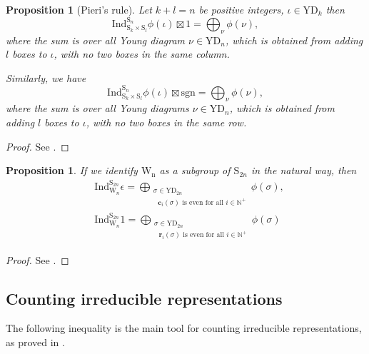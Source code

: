 \documentclass[12pt, a4paper]{amsart}
\numberwithin{equation}{section}
\newtheorem{prop}[thm]{Proposition}
\newcommand{\br}{{\mathbf{r}}}
\newcommand{\bc}{{\mathbf{c}}}
\newcommand{\BN}{{\mathbb {N}}}
\newcommand{\Ind}{{\mathrm{Ind}}}
\newcommand{\sgn}{{\mathrm{sgn}}}
\begin{document}
\begin{prop}[Pieri's rule]\label{Pieri}
    Let $k + l = n$ be positive integers, $\iota \in \mathrm{YD}_{k}$ then
    \begin{equation}
        \Ind_{\mathrm{S}_k \times \mathrm{S}_l}^{\mathrm{S}_{n}}\phi(\iota) \boxtimes 1 = \bigoplus_{\nu} \phi(\nu),
    \end{equation}
    where the sum is over all Young diagram $\nu \in \mathrm{YD}_n$, which is obtained from adding $l$ boxes to $\iota$, with no two boxes in the same column.
    
    Similarly, we have
    \begin{equation}
        \Ind_{\mathrm{S}_{k} \times \mathrm{S}_{l}}^{\mathrm{S}_n}\phi(\iota) \boxtimes \sgn = \bigoplus_{\nu}\phi(\nu),
    \end{equation}
    where the sum is over all Young diagrams $\nu \in \mathrm{YD}_n$, which is obtained from adding $l$ boxes to $\iota$, with no two boxes in the same row.
\end{prop}

\begin{proof}
    See \cite[Corollary 6.1.7]{GP}.
\end{proof}

\begin{prop}\label{branch}
    If we identify $\mathrm{W_n}$ as a subgroup of $\mathrm{S}_{2n}$ in the natural way, then
    \begin{align}
        &\Ind_{\mathrm{W}_n}^{\mathrm{S}_{2n}} \epsilon = \bigoplus_{\substack{\sigma \in \mathrm{YD}_{2n}\\ \textrm{ $\bc_{i}(\sigma)$ is even for all $i \in \BN^+$}}} \phi(\sigma),\\
        &\Ind_{\mathrm{W}_n}^{\mathrm{S}_{2n}} 1 = \bigoplus_{\substack{\sigma \in \mathrm{YD}_{2n}\\ \textrm{ $\br_{i}(\sigma)$ is even for all $i \in \BN^+$}}} \phi(\sigma)
    \end{align}
\end{prop}

\begin{proof}
    See \cite[Lemma 4.1 (b)]{BV83}.
\end{proof}

\subsection{Counting irreducible representations}

The following inequality is the main tool for counting irreducible representations, as proved in \cite{BMSZ}. 
\end{document}

